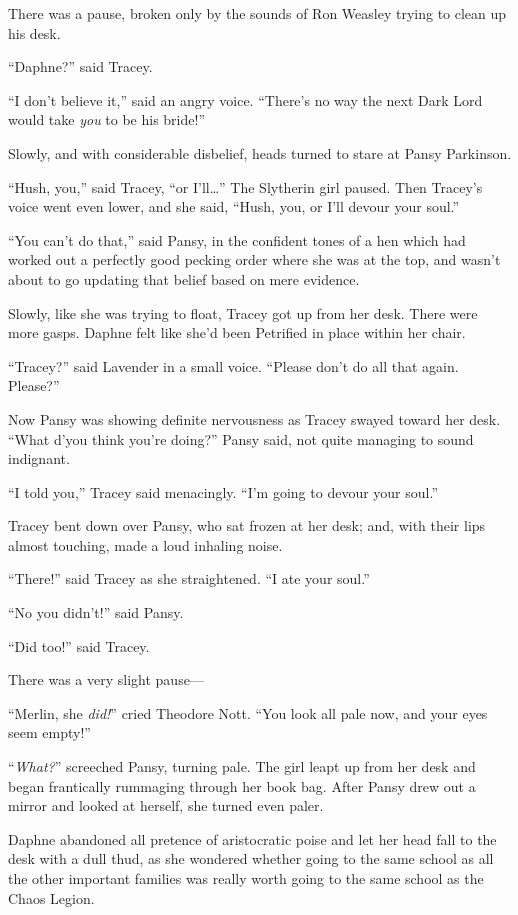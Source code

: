 There was a pause, broken only by the sounds of Ron Weasley trying to clean up his desk.

“Daphne?” said Tracey.

“I don’t believe it,” said an angry voice. “There’s no way the next Dark Lord would take \emph{you} to be his bride!”

Slowly, and with considerable disbelief, heads turned to stare at Pansy Parkinson.

“Hush, you,” said Tracey, “or I’ll…” The Slytherin girl paused. Then Tracey’s voice went even lower, and she said, “Hush, you, or I’ll devour your soul.”

“You can’t do that,” said Pansy, in the confident tones of a hen which had worked out a perfectly good pecking order where she was at the top, and wasn’t about to go updating that belief based on mere evidence.

Slowly, like she was trying to float, Tracey got up from her desk. There were more gasps. Daphne felt like she’d been Petrified in place within her chair.

“Tracey?” said Lavender in a small voice. “Please don’t do all that again. Please?”

Now Pansy was showing definite nervousness as Tracey swayed toward her desk. “What d’you think you’re doing?” Pansy said, not quite managing to sound indignant.

“I told you,” Tracey said menacingly. “I’m going to devour your soul.”

Tracey bent down over Pansy, who sat frozen at her desk; and, with their lips almost touching, made a loud inhaling noise.

“There!” said Tracey as she straightened. “I ate your soul.”

“No you didn’t!” said Pansy.

“Did too!” said Tracey.

There was a very slight pause—

“Merlin, she \emph{did!}” cried Theodore Nott. “You look all pale now, and your eyes seem empty!”

“\emph{What?}” screeched Pansy, turning pale. The girl leapt up from her desk and began frantically rummaging through her book bag. After Pansy drew out a mirror and looked at herself, she turned even paler.

Daphne abandoned all pretence of aristocratic poise and let her head fall to the desk with a dull thud, as she wondered whether going to the same school as all the other important families was really worth going to the same school as the Chaos Legion.

